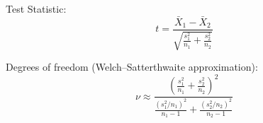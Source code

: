 \documentclass[a4paper,12pt]{report}
\begin{document}
Test Statistic:
\begin{equation}
t = \frac{\bar{X}_1 - \bar{X}_2}{\sqrt{\frac{s_1^2}{n_1} + \frac{s_2^2}{n_2}}}
\end{equation}

Degrees of freedom (Welch--Satterthwaite approximation):
\begin{equation}
\nu \approx \frac{\left(\frac{s_1^2}{n_1} + \frac{s_2^2}{n_2}\right)^2}{\frac{(s_1^2/n_1)^2}{n_1-1} + \frac{(s_2^2/n_2)^2}{n_2-1}}
\end{equation}


\end{document}
